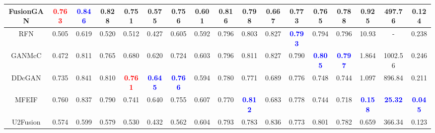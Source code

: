 \documentclass[10pt,twocolumn,letterpaper]{article}
\begin{document}
\begin{table*}[!htb]
\begin{tabular}{|c|cccccc|c|ccccc|c|ccc|}
		\footnotesize FusionGAN&\footnotesize \textcolor{red}{\textbf{0.763}}&\footnotesize \textcolor{blue}{\textbf{0.846}}&\footnotesize 0.828&\footnotesize  0.751&\footnotesize  0.575&\footnotesize 0.756&\footnotesize 0.601&\footnotesize 0.816&\footnotesize 0.798&\footnotesize 0.667&\footnotesize 0.773&\footnotesize 0.765&\footnotesize 0.788 &\footnotesize 0.925&\footnotesize 497.76 &\footnotesize 0.124 \\
		\hline 
		
		\footnotesize RFN&\footnotesize 0.505 &\footnotesize 0.619 &\footnotesize 0.520 &\footnotesize 0.512 &\footnotesize 0.427 &\footnotesize 0.605 &\footnotesize 0.592 &\footnotesize 0.796 &\footnotesize 0.803 &\footnotesize 0.827 &\footnotesize \textcolor{blue}{\textbf{0.793}} &\footnotesize 0.794 &\footnotesize 0.796 &\footnotesize 10.93&- &\footnotesize 0.238 \\
		\hline 
		
		\footnotesize GANMcC&\footnotesize 0.472&\footnotesize 0.811&\footnotesize 0.765&\footnotesize  0.680&\footnotesize  0.620&\footnotesize 0.724&\footnotesize 0.603&\footnotesize 0.796&\footnotesize 0.811&\footnotesize 0.827&\footnotesize 0.790&\footnotesize \textcolor{blue}{\textbf{0.805}}&\footnotesize \textcolor{blue}{\textbf{0.797}} &\footnotesize 1.864&\footnotesize 1002.56 &\footnotesize 0.246\\
		\hline 
		
		\footnotesize DDcGAN&\footnotesize 0.735&\footnotesize 0.841&\footnotesize 0.810&\footnotesize  \textcolor{red}{\textbf{0.761}}&\footnotesize  \textcolor{blue}{\textbf{0.645}}&\footnotesize \textcolor{blue}{\textbf{0.766}}&\footnotesize 0.594&\footnotesize 0.780&\footnotesize 0.771&\footnotesize 0.689&\footnotesize 0.776&\footnotesize 0.748&\footnotesize 0.744 &\footnotesize 1.097 &\footnotesize 896.84 &\footnotesize 0.211\\
		
		\hline  
		\footnotesize MFEIF&\footnotesize 0.760&\footnotesize 0.837&\footnotesize 0.790&\footnotesize  0.741&\footnotesize  0.640&\footnotesize 0.755&\footnotesize 0.607&\footnotesize 0.770&\footnotesize \textcolor{blue}{\textbf{0.812}}&\footnotesize 0.683&\footnotesize 0.778&\footnotesize 0.744&\footnotesize 0.718 &\footnotesize \textcolor{blue}{\textbf{0.158}} &\footnotesize \textcolor{blue}{\textbf{25.32}} &\footnotesize \textcolor{blue}{\textbf{0.045}} \\
		\hline 
		\footnotesize U2Fusion&\footnotesize 0.574&\footnotesize 0.599&\footnotesize 0.579&\footnotesize 0.530&\footnotesize  0.432&\footnotesize 0.562&\footnotesize 0.604&\footnotesize 0.793&\footnotesize 0.783&\footnotesize 0.836&\footnotesize 0.773&\footnotesize 0.801&\footnotesize 0.782 &\footnotesize 0.659 &\footnotesize 366.34 &\footnotesize 0.123\\
		\hline 
		

\end{tabular}
\end{table*}
\end{document}
